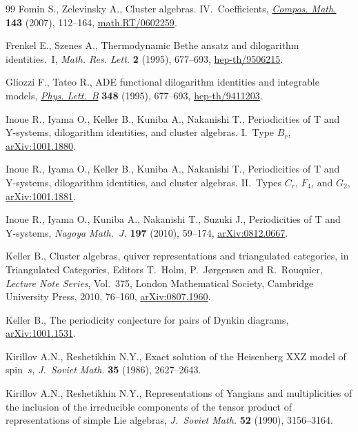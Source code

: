 \documentclass[pdftex]{sigma}
\numberwithin{equation}{section}
\theoremstyle{definition}
\begin{document}
\begin{thebibliography}{99}
Fomin S., Zelevinsky A.,
Cluster algebras. IV.~Coef\/f\/icients,
\href{http://dx.doi.org/10.1112/S0010437X06002521}{{\em Compos. Math.}} {\bf 143} (2007), 112--164,
\href{http://arxiv.org/abs/math.RT/0602259}{math.RT/0602259}.

Frenkel E., Szenes A.,
Thermodynamic Bethe ansatz and dilogarithm identities.~I,
{\em Math. Res. Lett.} {\bf 2} (1995), 677--693,
\href{http://arxiv.org/abs/hep-th/9506215}{hep-th/9506215}.

Gliozzi F., Tateo R.,
ADE functional dilogarithm identities and integrable models,
\href{http://dx.doi.org/10.1016/0370-2693(95)00125-5}{{\em Phys. Lett.~B}} {\bf 348} (1995), 677--693,
\href{http://arxiv.org/abs/hep-th/9411203}{hep-th/9411203}.

Inoue R., Iyama O., Keller B., Kuniba A., Nakanishi T.,
Periodicities of T and Y-systems, dilogarithm identities, and cluster algebras. I.~Type $B_r$,
\href{http://arxiv.org/abs/1001.1880}{arXiv:1001.1880}.

Inoue R., Iyama O., Keller B., Kuniba A., Nakanishi T.,
Periodicities of T and Y-systems, dilogarithm identities, and
  cluster algebras. II.~Types $C_r$, $F_4$, and $G_2$,
\href{http://arxiv.org/abs/1001.1881}{arXiv:1001.1881}.

Inoue R., Iyama O., Kuniba A., Nakanishi T., Suzuki J.,
Periodicities of T and Y-systems,
{\em Nagoya Math.~J.} {\bf 197} (2010), 59--174,
\href{http://arxiv.org/abs/0812.0667}{arXiv:0812.0667}.

Keller B.,
Cluster algebras, quiver representations and triangulated categories,
in Triangulated Categories, Editors T.~Holm, P.~J{\o}rgensen
  and R.~Rouquier,    {\em Lecture Note Series}, Vol.~375, London
  Mathematical Society, Cambridge University Press, 2010, 76--160,
\href{http://arxiv.org/abs/0807.1960}{arXiv:0807.1960}.

Keller B.,
The periodicity conjecture for pairs of Dynkin diagrams,
\href{http://arxiv.org/abs/1001.1531}{arXiv:1001.1531}.

Kirillov A.N.,  Reshetikhin N.Y.,
Exact solution of the Heisenberg XXZ model of spin~$s$,
{\em J.~Soviet Math.} {\bf 35} (1986), 2627--2643.

Kirillov  A.N.,  Reshetikhin N.Y.,
Representations of Yangians and multiplicities of the inclusion of the irreducible components of the tensor product of representations of simple Lie algebras,
 {\em J.~Soviet Math.} {\bf 52} (1990), 3156--3164.


\end{thebibliography}
\end{document}
